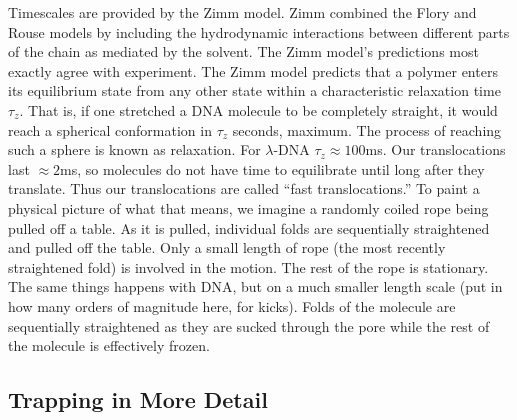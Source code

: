 \documentclass[aps,prl,preprint,groupedaddress]{revtex4}
\begin{document}
Timescales are provided by the Zimm model. Zimm combined the Flory and Rouse models by including the hydrodynamic interactions between different parts of the chain as mediated by the solvent. The Zimm model's predictions most exactly agree with experiment. The Zimm model predicts that a polymer enters its equilibrium state from any other state within a characteristic relaxation time \(\tau_z\). That is, if one stretched a DNA molecule to be completely straight, it would reach a spherical conformation in \(\tau_z\) seconds, maximum. The process of reaching such a sphere is known as relaxation. For \(\lambda\)-DNA \(\tau_z \approx 100\)ms. Our translocations last \(\approx 2\)ms, so molecules do not have time to equilibrate until long after they translate. Thus our translocations are called ``fast translocations.'' To paint a physical picture of what that means, we imagine a randomly coiled rope being pulled off a table. As it is pulled, individual folds are sequentially straightened and pulled off the table. Only a small length of rope (the most recently straightened fold) is involved in the motion. The rest of the rope is stationary. The same things happens with DNA, but on a much smaller length scale (put in how many orders of magnitude here, for kicks). Folds of the molecule are sequentially straightened as they are sucked through the pore while the rest of the molecule is effectively frozen.

\subsection{Trapping in More Detail}
\end{document}
